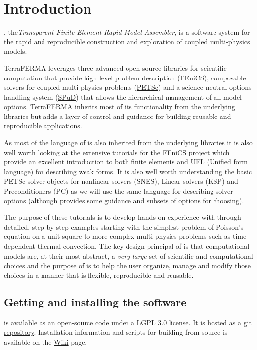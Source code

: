 \chapter{Introduction}

\TF{},  the\emph{Transparent Finite Element Rapid Model Assembler}, is
a software system for the rapid and reproducible construction and exploration of coupled multi-physics models.

TerraFERMA leverages three advanced open-source libraries for
scientific computation that provide high level problem description
(\href{http://fenicsproject.org}{FEniCS}), composable solvers for
coupled multi-physics problems
(\href{https://www.mcs.anl.gov/petsc}{PETSc}) and a science neutral
options handling system
(\href{http://www3.imperial.ac.uk/earthscienceandengineering/research/amcg/spud}{SPuD})
that allows the hierarchical management of all model
options. TerraFERMA inherits most of its functionality from the
underlying libraries but adds a layer of control and guidance for
building reusable and reproducible applications.

As most of the language of \TF{} is also inherited from the underlying
libraries it is also well worth looking at the extensive tutorials for
the \href{http://fenicsproject.org/documentation/tutorial}{FEniCS} project which provide an
excellent introduction to both finite elements and UFL (Unified form
language) for describing weak forms.  It is also well worth
understanding the basic PETSc solver objects for nonlinear solvers
(SNES), Linear solvers (KSP) and Preconditioners (PC) as we will use
the same language for describing solver options (although \TF{}
provides some guidance and subsets of options for choosing).

The purpose of these tutorials is to develop hands-on experience with
\TF{} through detailed, step-by-step examples starting with the
simplest problem of Poisson's equation on a unit square to more
complex multi-physics problems such as time-dependent thermal
convection.  The key design principal of \TF{} is that computational
models are, at their most abstract, a \emph{very large} set of
scientific and computational choices and the purpose of \TF{} is to
help the user organize, manage and modify those choices in a manner
that is flexible, reproducible and reusable.

\pagebreak{}
\section{Getting and installing the \TF{} software}
\label{sec:gett-inst-tf}

\TF{} is available as an open-source code under a LGPL 3.0
license.  It is hosted as a
\href{https://bitbucket.org/tferma/tferma}{git repository}.
Installation information and scripts for building from source is available on the
\href{https://bitbucket.org/tferma/tferma/wiki}{Wiki} page. 


